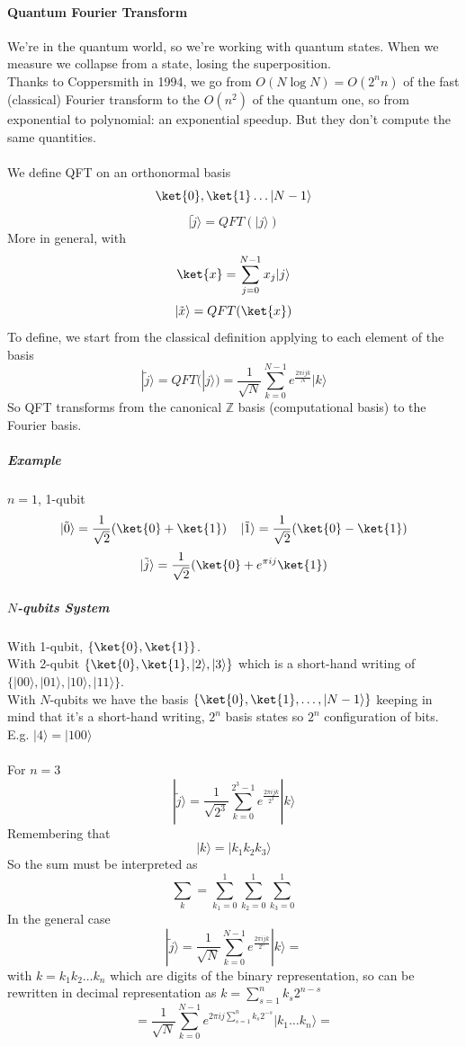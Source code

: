 \documentclass[10pt]{report}
\begin{document}
\paragraph{Quantum Fourier Transform} We're in the quantum world, so we're working with quantum states. When we measure we collapse from a state, losing the superposition.\\
Thanks to Coppersmith in 1994, we go from $O(N\log N) = O(2^n n)$ of the fast (classical) Fourier transform to the $O(n^2)$ of the quantum one, so from exponential to polynomial: an exponential speedup. But they don't compute the same quantities.\\\\
We define QFT on an orthonormal basis $$\ket{0},\ket{1}\ldots|N-1\rangle$$
$$|\tilde{j}\rangle = QFT(|j\rangle)$$
More in general, with $$\ket{x}=\sum_{j=0}^{N-1} x_j|j\rangle$$ $$|\tilde{x}\rangle = QFT(\ket{x})$$
To define, we start from the classical definition applying to each element of the basis
$$|\tilde{j}\rangle = QFT(|j\rangle) = \frac{1}{\sqrt{N}}\sum_{k=0}^{N-1} e^{\frac{2\pi ijk}{N}}|k\rangle$$
So QFT transforms from the canonical $\mathbb{Z}$ basis (computational basis) to the Fourier basis.
\subparagraph{Example} $n=1$, 1-qubit
$$|\tilde{0}\rangle=\frac{1}{\sqrt{2}}(\ket{0}+\ket{1})\:\:\:\:\:|\tilde{1}\rangle=\frac{1}{\sqrt{2}}(\ket{0}-\ket{1})$$
$$|\tilde{j}\rangle=\frac{1}{\sqrt{2}}(\ket{0}+e^{\pi ij}\ket{1})$$
\subparagraph{$N$-qubits System}
With 1-qubit, $\{\ket{0},\ket{1}\}$.\\
With 2-qubit $\{\ket{0},\ket{1},|2\rangle,|3\rangle\}$ which is a short-hand writing of $\{|00\rangle,|01\rangle,|10\rangle,|11\rangle\}$.\\
With $N$-qubits we have the basis $\{\ket{0},\ket{1},\ldots,|N-1\rangle\}$ keeping in mind that it's a short-hand writing, $2^n$ basis states so $2^n$ configuration of bits.\\E.g. $|4\rangle = |100\rangle$\\\\
For $n=3$ $$|\tilde{j}\rangle = \frac{1}{\sqrt{2^3}}\sum_{k=0}^{2^3-1}e^{\frac{2\pi ijk}{2^3}}|k\rangle$$
Remembering that
$$|k\rangle=|k_1k_2k_3\rangle$$
So the sum must be interpreted as $$\sum_k = \sum_{k_1=0}^1\sum_{k_2=0}^1\sum_{k_3=0}^1$$
In the general case
$$|\tilde{j}\rangle = \frac{1}{\sqrt{N}}\sum_{k=0}^{N-1}e^{\frac{2\pi ijk}{2^n}}|k\rangle =$$
with $k=k_1k_2\ldots k_n$ which are digits of the binary representation, so can be rewritten in decimal representation as $k = \sum_{s=1}^n k_s2^{n-s}$
$$= \frac{1}{\sqrt{N}}\sum_{k=0}^{N-1}e^{2\pi ij\sum_{s=1}^n k_s2^{-s}}|k_1\ldots k_n\rangle =$$
\end{document}
